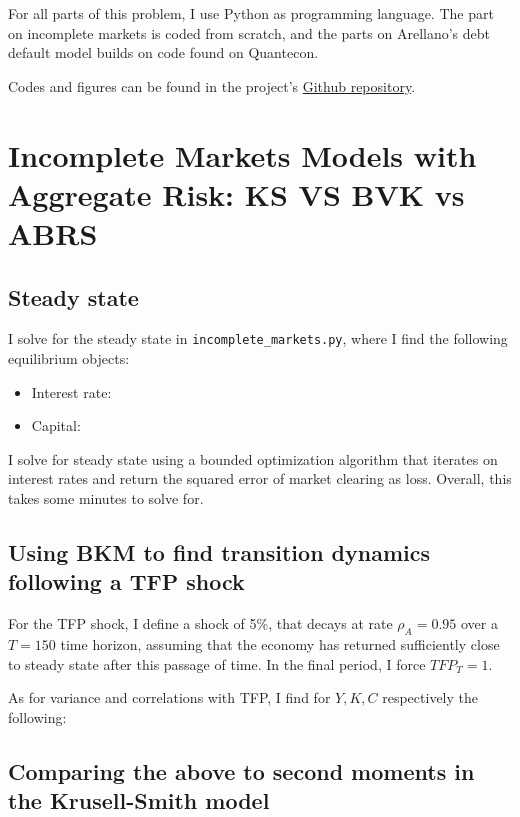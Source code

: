 

For all parts of this problem, I use Python as programming language. The part on incomplete markets is coded from scratch, and the parts on Arellano's debt default model builds on code found on Quantecon.

Codes and figures can be found in the project's \href{https://github.com/filipmellgren/QMM/tree/main/ps9}{Github repository}.

\section{Incomplete Markets Models with Aggregate Risk: KS VS BVK vs ABRS}

\subsection{Steady state}

I solve for the steady state in \texttt{incomplete\_markets.py}, where I find the following equilibrium objects:

\begin{itemize}
    \item Interest rate: 
    \item Capital: 
\end{itemize}

I solve for steady state using a bounded optimization algorithm that iterates on interest rates and return the squared error of market clearing as loss. Overall, this takes some minutes to solve for.

\subsection{Using BKM to find transition dynamics following a TFP shock}

For the TFP shock, I define a shock of 5\%, that decays at rate $\rho_A = 0.95$ over a $T = 150$ time horizon, assuming that the economy has returned sufficiently close to steady state after this passage of time. In the final period, I force $TFP_T = 1$.

As for variance and correlations with TFP, I find for $Y, K, C$ respectively the following:




\subsection{Comparing the above to second moments in the Krusell-Smith model}

